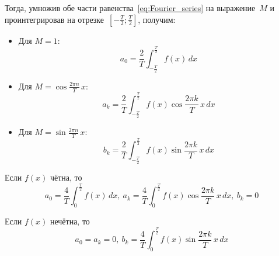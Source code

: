 Тогда, умножив обе части равенства~\ref*{eq:Fourier_series} на выражение~$M$ и проинтегрировав на отрезке~$\left[ -\frac{T}2; \frac{T}2 \right]$, получим:
\begin{itemize}
	\item Для $M = 1$:
	\begin{equation*}
	a_0 = \frac2T \int_{-\frac{T}2}^{\frac{T}2} f(x)\,dx
	\end{equation*}
	
	\item Для $M = \cos \frac{2 \pi n}T\,x$:
	\begin{equation*}
	a_k = \frac2T \int_{-\frac{T}2}^{\frac{T}2} f(x) \cos \frac{2 \pi k}T\,x\,dx
	\end{equation*}
	
	\item Для $M = \sin \frac{2 \pi n}T\,x$:
	\begin{equation*}
	b_k = \frac2T \int_{-\frac{T}2}^{\frac{T}2} f(x) \sin \frac{2 \pi k}T\,x\,dx
	\end{equation*}
\end{itemize}

Если $f(x)$ чётна, то
\begin{equation*}
a_0 = \frac4T \int_0^{\frac{T}2} f(x)\,dx, \
a_k = \frac4T \int_0^{\frac{T}2} f(x) \cos \frac{2 \pi k}T\,x\,dx, \
b_k = 0
\end{equation*}

Если $f(x)$ нечётна, то
\begin{equation*}
a_0 = a_k = 0, \
b_k = \frac4T \int_0^{\frac{T}2} f(x) \sin \frac{2 \pi k}T\,x\,dx
\end{equation*}